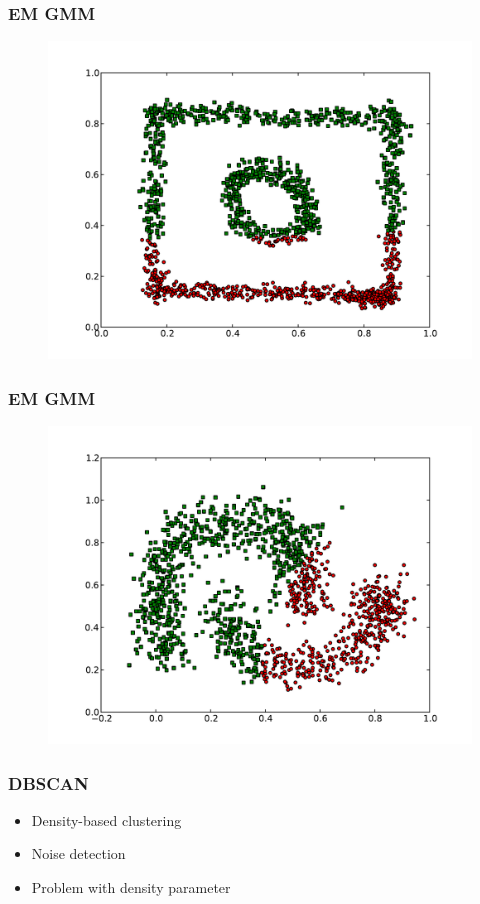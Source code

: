 \documentclass{beamer}
\begin{document}
\begin{frame}
\frametitle{EM GMM}
    \begin{figure}[]
    \includegraphics[scale=0.5]{GMM_circle-weird.pdf}
    \end{figure}
\end{frame}

\begin{frame}
\frametitle{EM GMM}
    \begin{figure}[]
    \includegraphics[scale=0.5]{GMM_half-moons.pdf}
    \end{figure}
\end{frame}



\begin{frame}
\frametitle{DBSCAN}
    \begin{itemize}
	\item Density-based clustering
    	\item Noise detection
   	\item Problem with density parameter
    \end{itemize}
\end{frame}
\end{document}
